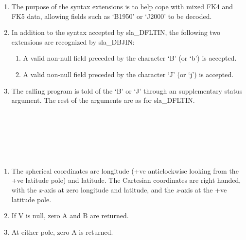 {
 \begin{enumerate}
  \item The purpose of the syntax extensions is to help cope with mixed
        FK4 and FK5 data, allowing fields such as `B1950' or `J2000'
        to be decoded.
  \item In addition to the syntax accepted by sla\_DFLTIN,
        the following two extensions are recognized by sla\_DBJIN:
        \begin{enumerate}
         \item A valid non-null field preceded by the character `B'
               (or `b') is accepted.
         \item A valid non-null field preceded by the character `J'
               (or `j') is accepted.
         \end{enumerate}
  \item The calling program is told of the `B' or `J' through an
        supplementary status argument.  The rest of
        the arguments are as for sla\_DFLTIN.
 \end{enumerate}
}
{
}
{
}
{
  \\
  \\
  \\
  \\
  \\
}
{
}
{
}
{
}
\notes
{
 \begin{enumerate}
  \item The spherical coordinates are longitude (+ve anticlockwise
        looking from the +ve latitude pole) and latitude.  The
        Cartesian coordinates are right handed, with the {\it x}-axis
        at zero longitude and latitude, and the {\it z}-axis at the
        +ve latitude pole.
  \item If V is null, zero A and B are returned.
  \item At either pole, zero A is returned.
 \end{enumerate}
}
